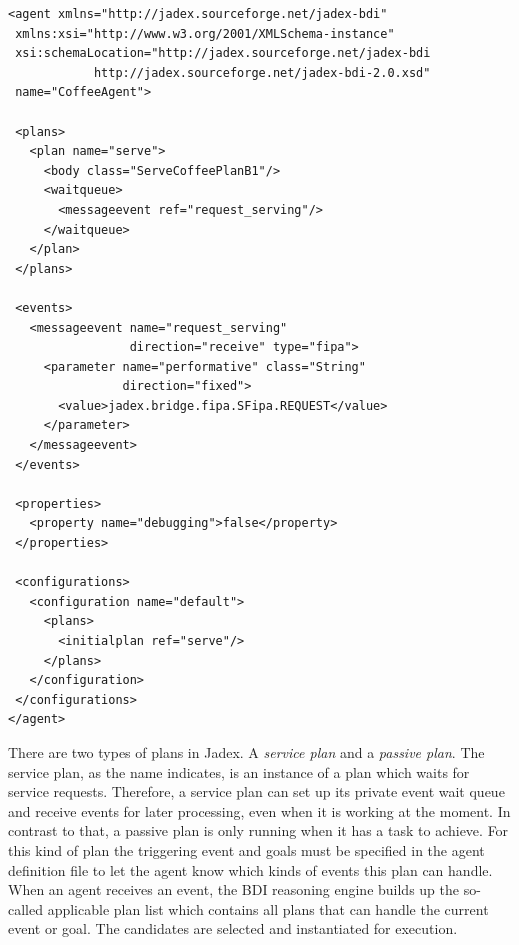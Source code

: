 \begin{lstlisting}[caption={Jadex XML file}, label=lst:jadex_xml]
<agent xmlns="http://jadex.sourceforge.net/jadex-bdi"
 xmlns:xsi="http://www.w3.org/2001/XMLSchema-instance"
 xsi:schemaLocation="http://jadex.sourceforge.net/jadex-bdi
            http://jadex.sourceforge.net/jadex-bdi-2.0.xsd"
 name="CoffeeAgent">

 <plans>
   <plan name="serve">
     <body class="ServeCoffeePlanB1"/>
     <waitqueue>
       <messageevent ref="request_serving"/>
     </waitqueue>
   </plan>
 </plans>

 <events>
   <messageevent name="request_serving"
                 direction="receive" type="fipa">
     <parameter name="performative" class="String"
                direction="fixed">
       <value>jadex.bridge.fipa.SFipa.REQUEST</value>
     </parameter>
   </messageevent>
 </events>

 <properties>
   <property name="debugging">false</property>
 </properties>

 <configurations>
   <configuration name="default">
     <plans>
       <initialplan ref="serve"/>
     </plans>
   </configuration>
 </configurations>
</agent>
\end{lstlisting}
There are two types of plans in Jadex.
A \emph{service plan} and a \emph{passive plan}.
The service plan, as the name indicates, is an instance of a plan which waits for service requests.
Therefore, a service plan can set up its private event wait queue and receive events for later processing, even when it is working at the moment.
In contrast to that, a passive plan is only running when it has a task to achieve.
For this kind of plan the triggering event and goals must be specified in the agent definition file to let the agent know which kinds of events this plan can handle.
When an agent receives an event, the BDI reasoning engine builds up the so-called applicable plan list which contains all plans that can handle the current event or goal.
The candidates are selected and instantiated for execution.

